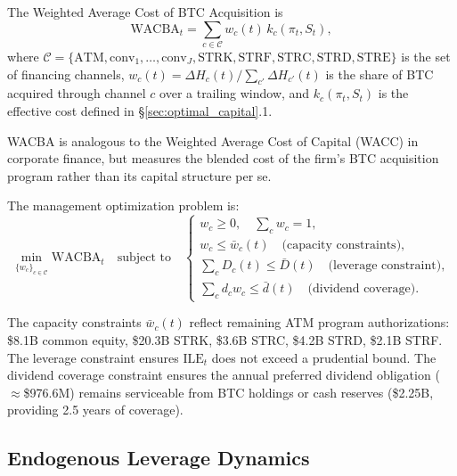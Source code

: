 \begin{definition}[WACBA]
\label{def:wacba}
The Weighted Average Cost of BTC Acquisition is
\begin{equation}
  \mathrm{WACBA}_t = \sum_{c \in \mathcal{C}} w_c(t)\, k_c(\pi_t, S_t),
  \label{eq:wacba}
\end{equation}
where $\mathcal{C} = \{\mathrm{ATM}, \mathrm{conv}_1, \ldots,
\mathrm{conv}_J, \mathrm{STRK}, \mathrm{STRF}, \mathrm{STRC},
\mathrm{STRD}, \mathrm{STRE}\}$ is the set of financing channels,
$w_c(t) = \Delta H_c(t) / \sum_{c'} \Delta H_{c'}(t)$ is the share
of BTC acquired through channel $c$ over a trailing window, and
$k_c(\pi_t, S_t)$ is the effective cost defined in
\S\ref{sec:optimal_capital}.1.
\end{definition}

WACBA is analogous to the Weighted Average Cost of Capital (WACC)
in corporate finance, but measures the blended cost of the firm's
BTC acquisition program rather than its capital structure per se.

\begin{proposition}
\label{prop:wacba_min}
The management optimization problem is:
\begin{equation}
  \min_{\{w_c\}_{c \in \mathcal{C}}} \mathrm{WACBA}_t
  \quad \text{subject to} \quad
  \begin{cases}
    w_c \ge 0, \quad \sum_c w_c = 1, \\
    w_c \le \bar{w}_c(t) \quad \text{(capacity constraints)}, \\
    \sum_c D_c(t) \le \bar{D}(t) \quad \text{(leverage constraint)}, \\
    \sum_c d_c w_c \le \bar{d}(t) \quad \text{(dividend coverage)}.
  \end{cases}
  \label{eq:wacba_min}
\end{equation}
\end{proposition}

The capacity constraints $\bar{w}_c(t)$ reflect remaining ATM program
authorizations: \$8.1B common equity, \$20.3B STRK, \$3.6B STRC,
\$4.2B STRD, \$2.1B STRF.
The leverage constraint ensures $\mathrm{ILE}_t$ does not exceed
a prudential bound.
The dividend coverage constraint ensures the annual preferred dividend
obligation ($\approx$\$976.6M) remains serviceable from BTC holdings
or cash reserves (\$2.25B, providing 2.5 years of coverage).

\subsection{Endogenous Leverage Dynamics}
\label{subsec:endo_leverage}

